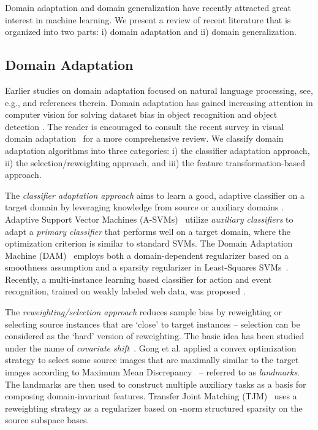 \documentclass[10pt,journal,compsoc]{IEEEtran}
\begin{document}
Domain adaptation and domain generalization have recently attracted great interest in machine learning.
We present a review of recent literature that is organized into two parts: i) domain adaptation and ii) domain generalization.

\vspace{-1em}
\subsection{Domain Adaptation}
Earlier studies on domain adaptation focused on natural language processing, see, e.g., \cite{Jiang:2008aa} and references therein.
Domain adaptation has gained increasing attention in computer vision for solving dataset bias in object recognition \cite{Saenko:2010aa,Gong:2012aa,Tommasi:2013ab,Fernando:2013aa,Hoffman_CVPR2014,Long2014a} and object detection \cite{Sun:BMVC2014}.
The reader is encouraged to consult the recent survey in visual domain adaptation~\cite{patel_dasurvey:2015} for a more comprehensive review.
We classify domain adaptation algorithms into three categories: i) the classifier adaptation approach, ii) the selection/reweighting approach, and iii) the feature transformation-based approach.

The \emph{classifier adaptation approach} aims to learn a good, adaptive classifier on a target domain by leveraging knowledge from source or auxiliary domains \cite{Yang:2007aa,DAM:2012,DuanTPAMI2012a,DuanTPAMI2012b,Niu_IJCV16}.
Adaptive Support Vector Machines (A-SVMs)~\cite{Yang:2007aa} utilize \emph{auxiliary classifiers} to adapt a \emph{primary classifier} that performs well on a target domain, where the optimization criterion is similar to standard SVMs. 
The Domain Adaptation Machine (DAM)~\cite{DAM:2012} employs both a domain-dependent regularizer based on a smoothness assumption and a sparsity regularizer in Least-Squares SVMs~\cite{LSSVM:2004}.
Recently, a multi-instance learning based classifier for action and event recognition, trained on weakly labeled web data, was proposed \cite{Niu_IJCV16}.
 

The \emph{reweighting/selection approach} reduces sample bias by reweighting or selecting source instances that are `close' to target instances -- selection can be considered as the `hard' version of reweighting.
The basic idea has been studied under the name of \emph{covariate shift}~\cite{Shimodaira:2000aa}.
Gong et al.\cite{Gong:2013ab} applied a convex optimization strategy to select some source images that are maximally similar to the target images according to Maximum Mean Discrepancy~\cite{Borgwardt:2006aa} -- referred to as \emph{landmarks}.
The landmarks are then used to construct multiple auxiliary tasks as a basis for composing domain-invariant features.
Transfer Joint Matching (TJM)~\cite{Long2014a} uses a reweighting strategy as a regularizer based on -norm structured sparsity on the source subspace bases.
\end{document}
